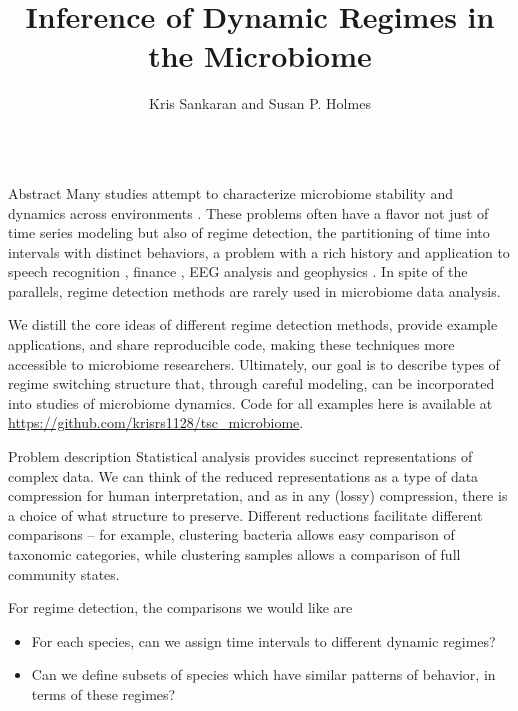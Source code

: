 \documentclass[final, 8pt]{beamer}
\title{Inference of Dynamic Regimes in the Microbiome}
\author{Kris Sankaran and Susan P. Holmes}
\institute{Department of Statistics, Stanford University}
\newlength{\onecolwid}
\begin{document}
\begin{frame}

\begin{columns}
\begin{column}{\onecolwid}

\begin{block}{Abstract}
Many studies attempt to characterize microbiome stability and dynamics across
environments \citep{costello2012application, stein2013ecological,
  faust2015metagenomics}. These problems often have a flavor not just of time
series modeling but also of regime detection, the partitioning of time into
intervals with distinct behaviors, a problem with a rich history and application
to speech recognition \citep{fox2011sticky}, finance \citep{lee2009optimal}, EEG
analysis \citep{camilleri2014automatic} and geophysics
\citep{weatherley2002relationship}. In spite of the parallels, regime detection
methods are rarely used in microbiome data analysis.

We distill the core ideas of different regime detection methods, provide example
applications, and share reproducible code, making these techniques more
accessible to microbiome researchers. Ultimately, our goal is to describe types
of regime switching structure that, through careful modeling, can be
incorporated into studies of microbiome dynamics. Code for all examples here is
available at \url{https://github.com/krisrs1128/tsc\_microbiome}.
\end{block}

\begin{block}{Problem description}
Statistical analysis provides succinct representations of complex data. We can
think of the reduced representations as a type of data compression for human
interpretation, and as in any (lossy) compression, there is a choice of what
structure to preserve. Different reductions facilitate different comparisons --
for example, clustering bacteria allows easy comparison of taxonomic categories,
while clustering samples allows a comparison of full community states.

For regime detection, the comparisons we would like are
\begin{itemize}
\item For each species, can we assign time intervals to different dynamic
  regimes?
\item Can we define subsets of species which have similar patterns of behavior,
  in terms of these regimes?
\end{itemize}
\end{block}


\end{column}
\end{columns}
\end{frame}
\end{document}
